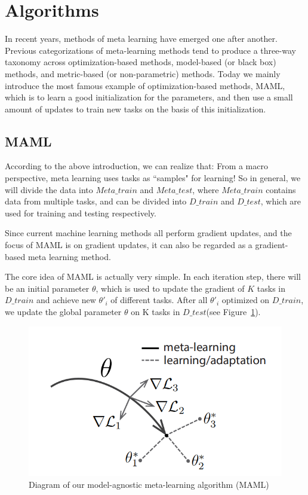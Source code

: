 \section{Algorithms}
In recent years, methods of meta learning have emerged one after another. Previous%
categorizations of meta-learning methods tend to produce a three-way taxonomy across optimization-based methods, model-based (or black box) methods, and metric-based (or non-parametric) methods.
Today we mainly introduce the most famous example of optimization-based methods, MAML, which is to learn a good initialization for the parameters, and then use a small amount of updates to train new tasks on the basis of this initialization.

\subsection{MAML}
According to the above introduction, we can realize that: From a macro perspective, meta learning uses tasks as ``samples" for learning! So in general, we will divide the data into $Meta\_train$ and $Meta\_test$, where $Meta\_train$ contains data from multiple tasks, and can be divided into $D\_train$ and $D\_test$, which are used for training and testing respectively.

Since current machine learning methods all perform gradient updates, and the focus of MAML is on gradient updates, it can also be regarded as a gradient-based meta learning method.

The core idea of MAML is actually very simple. In each iteration step, there will be an initial parameter $\theta$, which is used to update the gradient of $K$ tasks in $D\_train$ and achieve new $\theta'_i$ of different tasks. After all $\theta'_i$ optimized on $D\_train$, we update the global parameter $\theta$ on K tasks in $D\_test$(see Figure~\ref{fig:graph}).

\begin{figure}[h]
  \centering
  \includegraphics[totalheight=1.5in]{fig1.png}
  \caption{Diagram of our model-agnostic meta-learning algorithm (MAML)} \label{fig:graph}
\end{figure}

